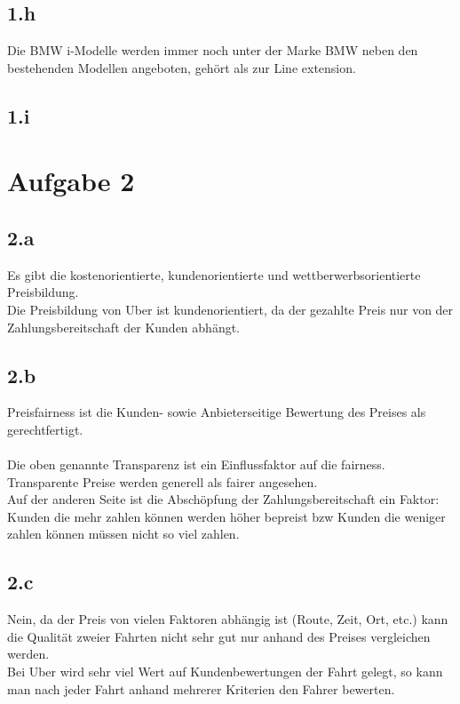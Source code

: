 \subsection{1.h}
    Die BMW i-Modelle werden immer noch unter der Marke BMW neben den bestehenden Modellen angeboten, gehört als zur Line extension.

\subsection{1.i}



\section{Aufgabe 2}
\subsection{2.a}
    Es gibt die kostenorientierte, kundenorientierte und wettberwerbsorientierte Preisbildung. \\
    Die Preisbildung von Uber ist kundenorientiert, da der gezahlte Preis nur von der Zahlungsbereitschaft der Kunden abhängt.

\subsection{2.b}
    Preisfairness ist die Kunden- sowie Anbieterseitige Bewertung des Preises als gerechtfertigt. \\
    \ \\
    Die oben genannte Transparenz ist ein Einflussfaktor auf die fairness. Transparente Preise werden generell als fairer angesehen. \\
    Auf der anderen Seite ist die Abschöpfung der Zahlungsbereitschaft ein Faktor: Kunden die mehr zahlen können werden höher bepreist bzw Kunden die weniger zahlen können müssen nicht so viel zahlen. \\

\subsection{2.c}
    Nein, da der Preis von vielen Faktoren abhängig ist (Route, Zeit, Ort, etc.) kann die Qualität zweier Fahrten nicht sehr gut nur anhand des Preises vergleichen werden. \\
    Bei Uber wird sehr viel Wert auf Kundenbewertungen der Fahrt gelegt, so kann man nach jeder Fahrt anhand mehrerer Kriterien den Fahrer bewerten. \\

